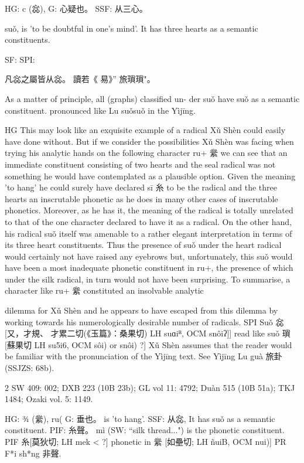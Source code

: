 HG:  c (惢),
G:	心疑也。
SSF: 从三心。


suǒ,
is 'to be doubtful in one's mind'.
It has three hearts as a semantic constituents.

SF: SPI:

凡惢之屬皆从惢。
讀若《 易》'' 旅瑣瑣"。

As a matter of principle, all (graphs) classified un- der suǒ have suǒ as a semantic constituent. pronounced like Lu suǒsuǒ in the Yìjīng.

HG This may look like an exquisite example of a radical Xǔ Shèn could easily have done without. But if we consider the possibilities Xǔ Shèn was facing when trying his analytic hands on the following character ru+ 繠 we can see that an immediate constituent consisting of two hearts and the seal radical was not something he would have contemplated as a plausible option. Given the meaning 'to hang' he could surely have declared sī 糸 to be the radical and the three hearts an inscrutable phonetic as he does in many other cases of inscrutable phonetics. Moreover, as he has it, the meaning of the radical is totally unrelated to that of the one character declared to have it as a radical. On the other hand, his radical suǒ itself was amenable to a rather elegant interpretation in terms of its three heart constituents. Thus the presence of suǒ under the heart radical would certainly not have raised any eyebrows but, unfortunately, this suǒ would have been a most inadequate phonetic constituent in ru+, the presence of which under the silk radical, in turn would not have been surprising. To summarise, a character like ru+ 繠 constituted an insolvable analytic




dilemma for Xǔ Shèn and he appears to have escaped from this dilemma by working towards his numerologically desirable number of radicals.
SPI     Suǒ 惢 [又，才規、 才累二切(《玉篇》：桑果切) LH suɑiᴮ, OCM snôiʔ]] read like suǒ 瑣
[蘇果切 LH su5i6, OCM sôi) or snôi) ?]
Xǔ Shèn assumes that the reader would be familiar with the pronunciation of the Yìjīng text.
See Yìjīng Lu guà 旅卦 (SSJZS: 68b).

2 SW 409: 002; DXB 223 (10B 23b); GL vol 11: 4792; Duàn 515 (10B 51a); TKJ 1484; Ozaki vol. 5: 1149.


HG:
¾ (繠),
ru(
G:
垂也。
is 'to hang'.
SSF:
从惢,
It has suǒ as a semantic constituent.
PIF:
糸聲。
mì (SW: ``silk thread...") is the phonetic constituent.
PIF     糸[莫狄切; LH mek < ?] phonetic in 繠 [如壘切; LH ñuiB, OCM nui)]
PR	F*i sh*ng 非聲.


